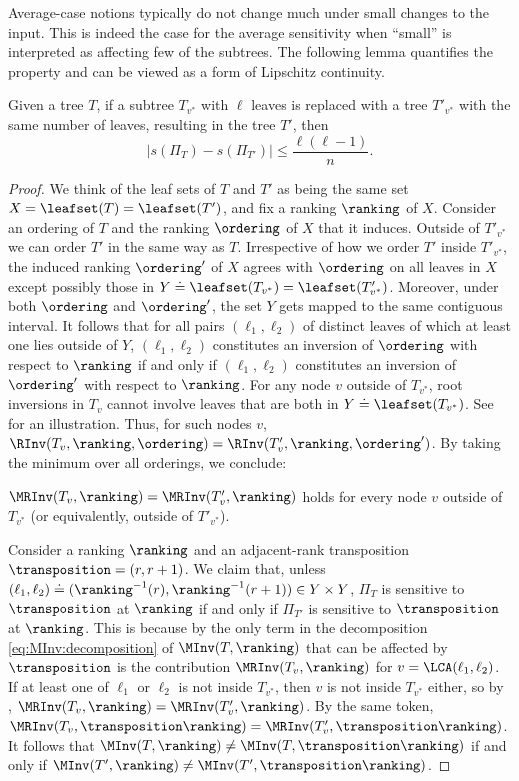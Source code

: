 Average-case notions typically do not change much under small changes to the input. This is indeed the case for the average sensitivity when ``small'' is interpreted as affecting few of the subtrees. The following lemma quantifies the property and can be viewed as a form of Lipschitz continuity.
\begin{lemma}
    \label{lemma:sensitivity:lipschitz}    
    Given a tree $T$, if a subtree $T_{v^*}$ with $\ell$ leaves is replaced with a tree $T'_{v^*}$ with the same number of leaves, resulting in the tree $T'$, then
    \[|s(\Pi_T)-s(\Pi_{T'})| \le \frac{\ell(\ell-1)}{n}. \]
\end{lemma}
\begin{proof}
We think of the leaf sets of $T$ and $T'$ as being the same set $X=\leafset(T)=\leafset(T')$, and fix a ranking $\ranking$ of $X$. Consider an ordering of $T$ and the ranking $\ordering$ of $X$ that it induces. Outside of $T'_{v^*}$ we can order $T'$ in the same way as $T$. Irrespective of how we order $T'$ inside $T'_{v^*}$, the induced ranking $\ordering'$ of $X$ agrees with $\ordering$ on all leaves in $X$ except possibly those in $Y \doteq \leafset(T_{v^*})=\leafset(T'_{v^*})$. Moreover, under both $\ordering$ and $\ordering'$, the set $Y$ gets mapped to the same contiguous interval. It follows that for all pairs $(\ell_1,\ell_2)$ of distinct leaves of which at least one lies outside of $Y$, $(\ell_1,\ell_2)$ constitutes an inversion of $\ordering$ with respect to $\ranking$ if and only if $(\ell_1,\ell_2)$ constitutes an inversion of $\ordering'$ with respect to $\ranking$. For any node $v$ outside of $T_{v^*}$, root inversions in $T_v$ cannot involve leaves that are both in $Y \doteq \leafset(T_{v^*})$. See  for an illustration. Thus, for such nodes $v$, $\RInv(T_v,\ranking,\ordering) = \RInv(T'_v,\ranking,\ordering')$. By taking the minimum over all orderings, we conclude:
\begin{claim}\label{claim:root:insensitive}
$\MRInv(T_v,\ranking) = \MRInv(T'_v,\ranking)$ holds for every node $v$ outside of $T_{v^*}$ (or equivalently, outside of $T'_{v^*}$).
\end{claim}

Consider a ranking $\ranking$ and an adjacent-rank transposition $\transposition=(r,r+1)$. We claim that, unless $(\ell_1,\ell_2) \doteq (\ranking^{-1}(r),\ranking^{-1}(r+1)) \in Y \times Y$, $\Pi_T$ is sensitive to $\transposition$ at $\ranking$ if and only if $\Pi_{T'}$ is sensitive to $\transposition$ at $\ranking$. This is because by  the only term in the decomposition \eqref{eq:MInv:decomposition} of $\MInv(T,\ranking)$ that can be affected by $\transposition$ is the contribution $\MRInv(T_v,\ranking)$ for $v = \LCA(\ell_1,\ell_2)$. If at least one of $\ell_1$ or $\ell_2$ is not inside $T_{v^*}$, then $v$ is not inside $T_{v^*}$ either, so by , $\MRInv(T_v,\ranking) = \MRInv(T'_v,\ranking)$. By the same token, $\MRInv(T_v,\transposition \ranking) = \MRInv(T'_v,\transposition \ranking)$. It follows that $\MInv(T,\ranking) \ne \MInv(T,\transposition \ranking)$ if and only if $\MInv(T',\ranking) \ne \MInv(T',\transposition \ranking)$.


\end{proof}
